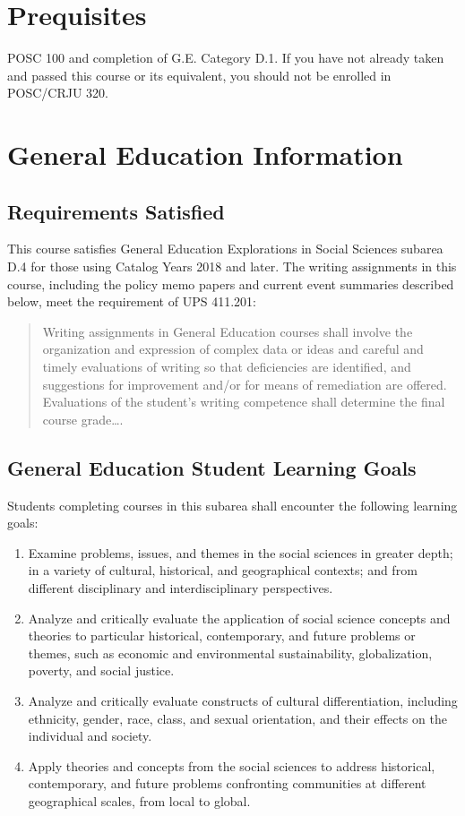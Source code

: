 \documentclass[11pt, letterpaper]{article}
\begin{document}
\section*{Prequisites}

POSC 100 and completion of G.E. Category D.1.  If you have not already taken and passed this course or its equivalent, you should not be enrolled in POSC/CRJU 320.

\section*{General Education Information}


\subsection*{Requirements Satisfied}

	This course satisfies General Education Explorations in Social Sciences subarea D.4 for those using Catalog Years 2018 and later. The writing assignments in this course, including the policy memo papers and current event summaries described below, meet the requirement of UPS 411.201: 
	\begin{quote}Writing assignments in General Education courses shall involve the organization and expression of complex data or ideas and careful and timely evaluations of writing so that deficiencies are identified, and suggestions for improvement and/or for means of remediation are offered. Evaluations of the student's writing competence shall determine the final course grade\ldots .\end{quote}

\subsection*{General Education Student Learning Goals}

	Students completing courses in this subarea shall encounter the following learning goals:

\begin{enumerate}
	\item Examine problems, issues, and themes in the social sciences in greater depth; in a variety of cultural, historical, and geographical contexts; and from different disciplinary and interdisciplinary perspectives.
	\item Analyze and critically evaluate the application of social science concepts and theories to particular historical, contemporary, and future problems or themes, such as economic and environmental sustainability, globalization, poverty, and social justice.
	\item Analyze and critically evaluate constructs of cultural differentiation, including ethnicity, gender, race, class, and sexual orientation, and their effects on the individual and society.
	\item Apply theories and concepts from the social sciences to address historical, contemporary, and future problems confronting communities at different geographical scales, from local to global.
\end{enumerate}
\end{document}
